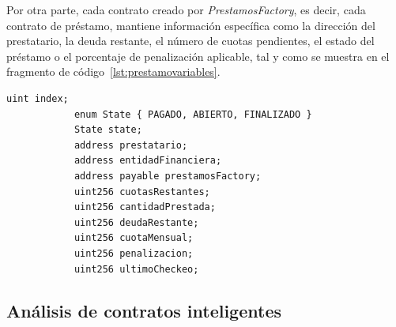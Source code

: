 Por otra parte, cada contrato creado por \textit{PrestamosFactory}, es decir, cada contrato de préstamo, mantiene información específica como la dirección
del prestatario, la deuda restante, el número de cuotas pendientes, 
el estado del préstamo o el porcentaje de penalización aplicable, tal y como 
se muestra en el fragmento de código~\ref{lst:prestamovariables}.



        \begin{lstlisting}[language=Solidity, 
            caption={Variables contrato préstamo},
            label={lst:prestamovariables}]
            uint index;
            enum State { PAGADO, ABIERTO, FINALIZADO }
            State state;
            address prestatario;
            address entidadFinanciera;
            address payable prestamosFactory;
            uint256 cuotasRestantes;
            uint256 cantidadPrestada;
            uint256 deudaRestante;
            uint256 cuotaMensual;
            uint256 penalizacion;
            uint256 ultimoCheckeo;
        \end{lstlisting}



\subsection{Análisis de contratos inteligentes}

